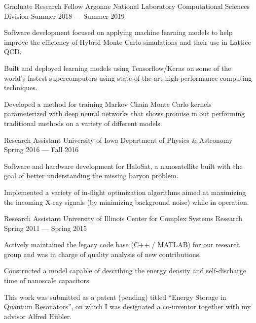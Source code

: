 %
\vspace{-1.75ex}
\begin{cventries}
  \cventrycustom%
  {Graduate Research Fellow} %
  {Argonne National Laboratory} %
  {Computational Sciences Division} %
  {Summer 2018 --- Summer 2019} %
  {
    \begin{cvitemscustom} %
    \item{Software development focused on applying machine learning models to
      help improve the efficiency of Hybrid Monte Carlo simulations and their
      use in Lattice QCD.}
    \item{Built and deployed learning models using Tensorflow/Keras on some of
      the world's fastest supercomputers using state-of-the-art
      high-performance computing techniques.}
    \item{Developed a method for training Markov Chain Monte Carlo kernels
      parameterized with deep neural networks that shows promise in out
      performing traditional methods on a variety of different models.}
    \end{cvitemscustom}
  }
  \vspace{-2mm}
  \cventrycustom%
  {Research Assistant} %
  {University of Iowa} %
  {Department of Physics \& Astronomy} %
  {Spring 2016 --- Fall 2016} %
  {
    \begin{cvitemscustom} %
    \item{Software and hardware development for HaloSat, a nanosatellite built
      with the goal of better understanding the missing baryon problem.}
    \item{Implemented a variety of in-flight optimization algorithms aimed at
      maximizing the incoming X-ray signals (by minimizing background noise)
      while in operation.}
    \end{cvitemscustom}
  }
  \vspace{-2mm}
  \cventrycustom%
  {Research Assistant} %
  {University of Illinois}
  {Center for Complex Systems Research} %
  {Spring 2011 --- Spring 2015}
  {
    \begin{cvitemscustom}
    \item{Actively maintained the legacy code base (C++ / MATLAB) for our
      research group and was in charge of quality analysis of new
      contributions.}
    \item{Constructed a model capable of describing the energy density and
      self-discharge time of nanoscale capacitors.}
    \item {This work was submitted as a patent (pending) titled ``Energy Storage
      in Quantum Resonators'', on which I was designated a co-inventor together
      with my advisor Alfred H\"ubler.}
    \end{cvitemscustom}
  }
\end{cventries}
%

